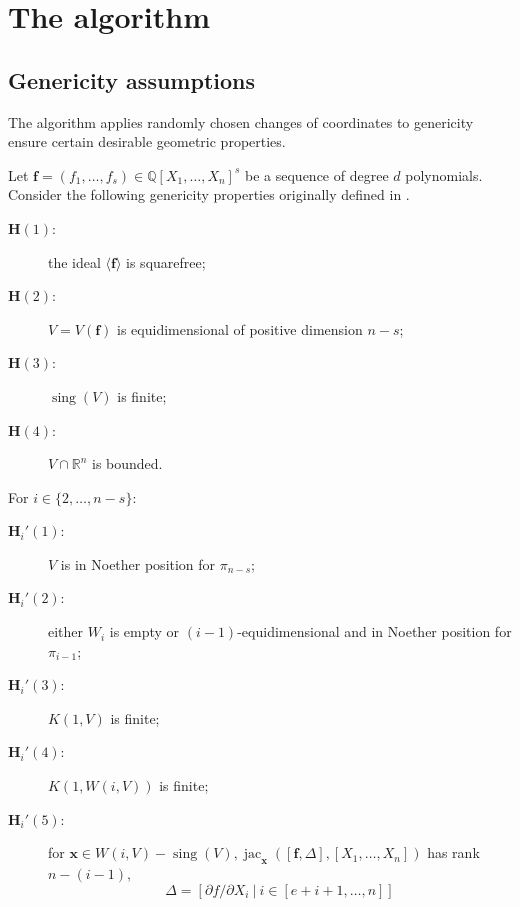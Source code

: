\documentclass[12pt]{article}
\DeclareMathOperator{\sing}{sing}
\DeclareMathOperator{\jac}{jac}
\begin{document}
\section{The algorithm}

\subsection{Genericity assumptions}
The algorithm applies randomly chosen changes of coordinates to genericity ensure certain desirable geometric properties. 



Let $\bm f = (f_1,\hdots,f_s) \in  \mathbb{Q}[X_1,\hdots,X_n]^s$ be a sequence of degree $d$ polynomials. Consider the following genericity properties originally defined in \cite{SchostMohabBabySteps2011}. 
\begin{description}
\item [$\bm H(1):$] the ideal $\langle \bm f \rangle$ is squarefree; 
\item [$\bm H(2):$] $V = V(\bm f)$ is equidimensional of positive dimension $n-s$;
\item [$\bm H(3):$] $\sing(V)$ is finite;
\item [$\bm H(4):$] $V \cap \mathbb{R}^n$ is bounded. 
\end{description}
%
For $i \in \{2,\hdots,n-s\}$:
%
%
\begin{description}
\item [$\bm H_i'(1):$] $V$ is in Noether position for $\pi_{n-s}$; 
\item [$\bm H_i'(2):$] either $W_i$ is empty or $(i-1)$-equidimensional and in Noether position for $\pi_{i-1}$;
\item [$\bm H_i'(3):$] $K(1,V)$ is finite;
\item [$\bm H_i'(4):$] $K(1,W(i,V))$ is finite; 
\item [$\bm H_i'(5):$] for $\bm x \in W(i,V)-\sing(V), \jac_{\bm x}([\bm f, \Delta],[X_1,\hdots,X_n])$ has rank $n-(i-1),$
\[
\Delta = [\partial f / \partial X_i~|~i \in [e+i+1,\hdots,n]]
\]
\end{description}
%
%
\end{document}
